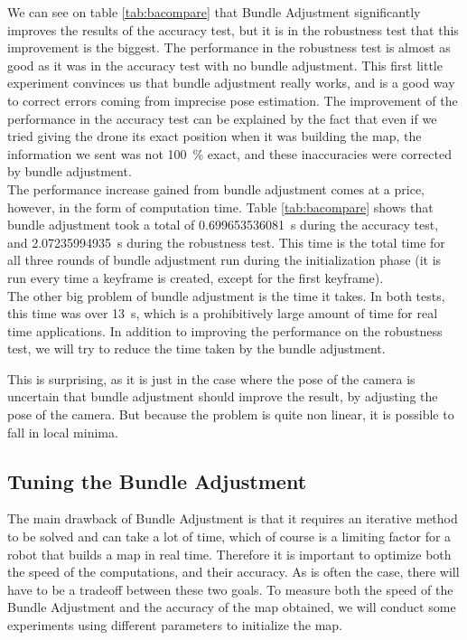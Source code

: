 We can see on table \ref{tab:bacompare} that Bundle Adjustment significantly improves the results of the accuracy test, but it is in the robustness test that this improvement is the biggest. The performance in the robustness test is almost as good as it was in  the accuracy test with no bundle adjustment. This first little experiment convinces us that bundle adjustment really works, and is a good way to correct errors coming from imprecise pose estimation. The improvement of the performance in the accuracy test can be explained by the fact that even if we tried giving the drone its exact position when it was building the map, the information we sent was not \SI{100}{\percent} exact, and these inaccuracies were corrected by bundle adjustment.\\

The performance increase gained from bundle adjustment comes at a price, however, in the form of computation time. Table \ref{tab:bacompare} shows that bundle adjustment took a total of \SI{0.699653536081}{\second} during the accuracy test, and \SI{2.07235994935}{\second} during the robustness test. This time is the total time for all three rounds of bundle adjustment run during the initialization phase (it is run every time a keyframe is created, except for the first keyframe).\\
The other big problem of bundle adjustment is the time it takes. In both tests, this time was over \SI{13}{\second}, which is a prohibitively large amount of time for real time applications. In addition to improving the performance on the robustness test, we will try to reduce the time taken by the bundle adjustment.


This is surprising, as it is just in the case where the pose of the camera is uncertain that bundle adjustment should improve the result, by adjusting the pose of the camera. But because the problem is quite non linear, it is possible to fall in local minima.




\subsection{Tuning the Bundle Adjustment}
The main drawback of Bundle Adjustment is that it requires an iterative method to be solved and can take a lot of time, which of course is a limiting factor for a robot that builds a map in real time. Therefore it is important to optimize both the speed of the computations, and their accuracy. As is often the case, there will have to be a tradeoff between these two goals. To measure both the speed of the Bundle Adjustment and the accuracy of the map obtained, we will conduct some experiments using different parameters to initialize the map.

